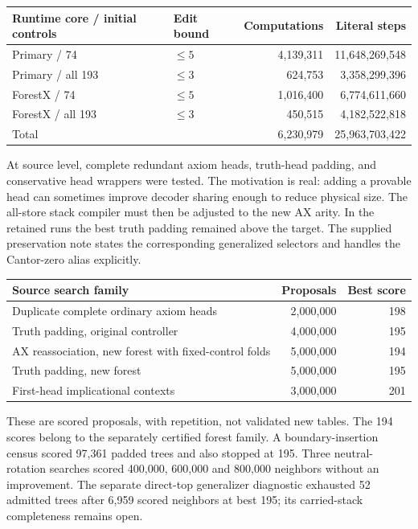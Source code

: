 \documentclass[11pt]{article}
\begin{document}
\begin{center}\small
\begin{tabular}{llrr}
\toprule Runtime core / initial controls & Edit bound & Computations & Literal steps\\\midrule
Primary / 74 & $\le5$ & 4,139,311 & 11,648,269,548\\
Primary / all 193 & $\le3$ & 624,753 & 3,358,299,396\\
ForestX / 74 & $\le5$ & 1,016,400 & 6,774,611,660\\
ForestX / all 193 & $\le3$ & 450,515 & 4,182,522,818\\\midrule
Total & & 6,230,979 & 25,963,703,422\\\bottomrule
\end{tabular}
\end{center}

At source level, complete redundant axiom heads, truth-head padding,
and conservative head wrappers were tested. The motivation is real:
adding a provable head can sometimes improve decoder sharing enough
to reduce physical size. The all-store stack compiler must then be
adjusted to the new AX arity. In the retained runs the best truth
padding remained above the target. The supplied preservation note
states the corresponding generalized selectors and handles the
Cantor-zero alias explicitly.

\begin{center}\small
\begin{tabular}{p{}rr}
\toprule Source search family & Proposals & Best score\\\midrule
Duplicate complete ordinary axiom heads & 2,000,000 & 198\\
Truth padding, original controller & 4,000,000 & 195\\
AX reassociation, new forest with fixed-control folds & 5,000,000 & 194\\
Truth padding, new forest & 5,000,000 & 195\\
First-head implicational contexts & 3,000,000 & 201\\\bottomrule
\end{tabular}
\end{center}
These are scored proposals, with repetition, not validated new tables.
The 194 scores belong to the separately certified forest family. A
boundary-insertion census scored 97,361 padded trees and also stopped
at 195. Three neutral-rotation searches scored 400,000, 600,000 and
800,000 neighbors without an improvement. The separate direct-top
generalizer diagnostic exhausted 52 admitted trees after 6,959 scored
neighbors at best 195; its carried-stack completeness remains open.
\end{document}
